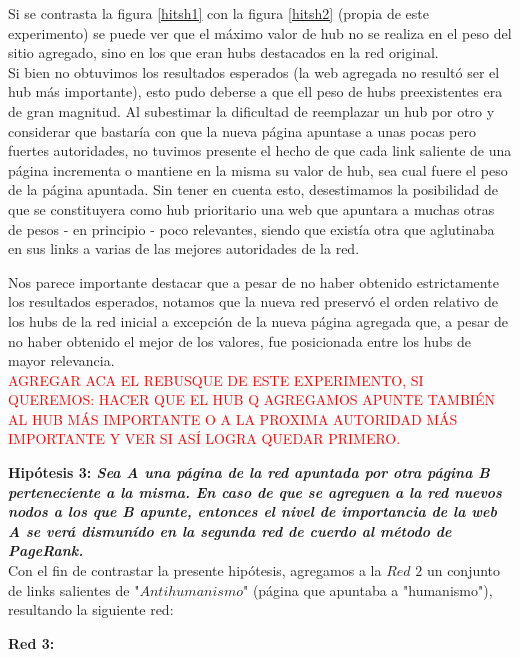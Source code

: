 \documentclass[a4paper]{article}
\begin{document}
Si se contrasta la figura \ref{hitsh1} con la figura \ref{hitsh2} (propia de este experimento) se puede ver que el máximo valor de hub  no se realiza en el peso del sitio agregado, sino en los que eran hubs destacados en la red original. \\
Si bien no obtuvimos los resultados esperados (la web agregada no resultó ser el hub más importante), esto pudo deberse a que ell peso de hubs preexistentes era de gran magnitud. Al subestimar la dificultad de reemplazar un hub por otro y considerar que bastaría con que la nueva página apuntase a unas pocas pero fuertes autoridades, no tuvimos presente el hecho de que cada link saliente de una página incrementa o mantiene en la misma su valor de hub, sea cual fuere el peso de la página apuntada. Sin tener en cuenta esto, desestimamos la posibilidad de que se constituyera como hub prioritario una web que apuntara a muchas otras de pesos - en principio - poco relevantes, siendo que existía otra que aglutinaba en sus links a varias de las mejores autoridades de la red.

Nos parece importante destacar que a pesar de no haber obtenido estrictamente los resultados esperados, notamos que la nueva red preservó el orden relativo de los hubs de la red inicial a excepción de la nueva página agregada que, a pesar de no haber obtenido el mejor de los valores, fue posicionada entre los hubs de mayor relevancia.\\

\textcolor{red}{AGREGAR ACA EL REBUSQUE DE ESTE EXPERIMENTO, SI QUEREMOS: HACER QUE EL HUB Q AGREGAMOS APUNTE TAMBIÉN AL HUB MÁS IMPORTANTE O A LA PROXIMA AUTORIDAD MÁS IMPORTANTE Y VER SI ASÍ LOGRA QUEDAR PRIMERO. }\\

\newpage

\textbf{Hipótesis 3: \itshape{Sea A una página de la red apuntada por otra página B perteneciente a la misma. En caso de que se agreguen a la red nuevos nodos a los que B apunte, entonces el nivel de importancia de la web A se verá dismunído en la segunda red de cuerdo al método de PageRank.}}\\

Con el fin de contrastar la presente hipótesis, agregamos a la $Red$ $2$ un conjunto de links salientes de "$Antihumanismo$" (página que apuntaba a "humanismo"), resultando la siguiente red:

\textbf{Red 3:}\\
\end{document}
